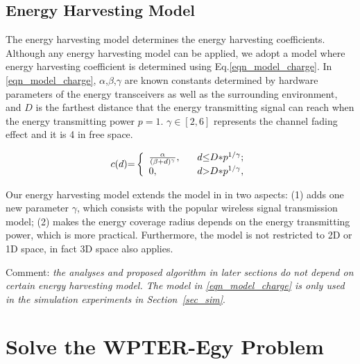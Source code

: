 \documentclass[journal,10pt]{IEEEtran}
\begin{document}
\subsection{Energy Harvesting Model}

The energy harvesting model determines the energy harvesting coefficients. Although any energy harvesting model can be applied, we adopt a model where energy harvesting coefficient is determined using Eq.\eqref{eqn_model_charge}. In \eqref{eqn_model_charge}, $\alpha$,$\beta$,$\gamma$ are known constants determined by hardware parameters of the energy transceivers as well as the surrounding environment, and $D$ is the farthest distance that the energy transmitting signal can reach when the energy transmitting power $p{=}1$. $\gamma{\in}[2,6]$ represents the channel fading effect and it is 4 in free space.

\begin{equation}
\label{eqn_model_charge}
c(d){=}\left\{
\begin{array}{ll}
\frac{\alpha}{(\beta{+}d)^{\gamma}}, \hspace{3mm}&d{\leq}D{*}p^{1/\gamma};\\
0,&d{>}D{*}p^{1/\gamma},
\end{array}
\right.
\end{equation}

Our energy harvesting model extends the model in \cite{Dai2017TON} in two aspects: (1) adds one new parameter $\gamma$, which consists with the popular wireless signal transmission model; (2) makes the energy coverage radius depends on the energy transmitting power, which is more practical. Furthermore, the model is not restricted to 2D or 1D space, in fact 3D space also applies.

Comment: \textit{the analyses and proposed algorithm in later sections do not depend on certain energy harvesting model. The model in \eqref{eqn_model_charge} is only used in the simulation experiments in Section~\ref{sec_sim}}.

\section{Solve the WPTER-Egy Problem}
\label{sec_wpter_egy}
\end{document}

